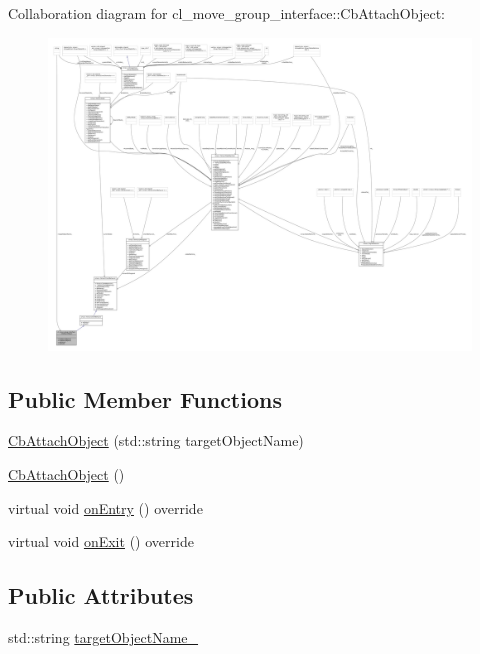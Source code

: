 Collaboration diagram for cl\+\_\+move\+\_\+group\+\_\+interface\+:\+:Cb\+Attach\+Object\+:
\nopagebreak
\begin{figure}[H]
\begin{center}
\leavevmode
\includegraphics[width=350pt]{classcl__move__group__interface_1_1CbAttachObject__coll__graph}
\end{center}
\end{figure}
\subsection*{Public Member Functions}
\begin{DoxyCompactItemize}
\item 
\hyperlink{classcl__move__group__interface_1_1CbAttachObject_abc9e3e2b9d47cac4a868b020b4d79eba}{Cb\+Attach\+Object} (std\+::string target\+Object\+Name)
\item 
\hyperlink{classcl__move__group__interface_1_1CbAttachObject_ad824d72eedb228a517bda607e39c22ec}{Cb\+Attach\+Object} ()
\item 
virtual void \hyperlink{classcl__move__group__interface_1_1CbAttachObject_a05cd996ea25ee1b2ae74541a5ec56e98}{on\+Entry} () override
\item 
virtual void \hyperlink{classcl__move__group__interface_1_1CbAttachObject_a6e85287bde0cedc12a90da8776ed4a16}{on\+Exit} () override
\end{DoxyCompactItemize}
\subsection*{Public Attributes}
\begin{DoxyCompactItemize}
\item 
std\+::string \hyperlink{classcl__move__group__interface_1_1CbAttachObject_a58dcc567e6316e57eb36e6d5a38f7287}{target\+Object\+Name\+\_\+}
\end{DoxyCompactItemize}
